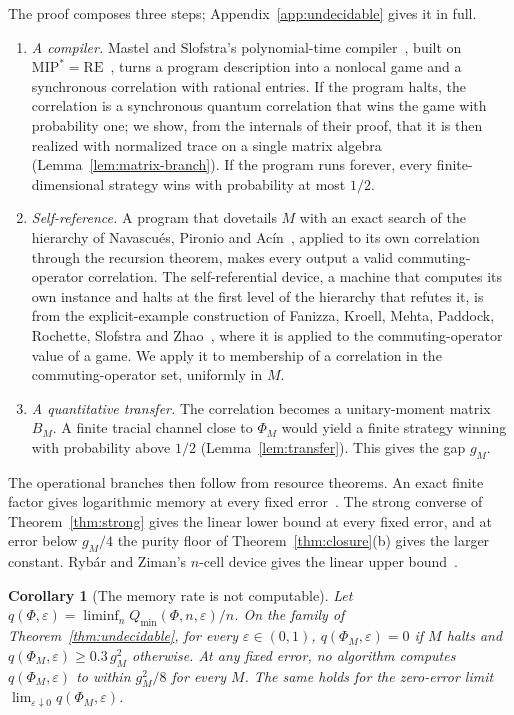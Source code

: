 \documentclass[11pt]{article}
\newtheorem{corollary}[lemma]{Corollary}
\theoremstyle{definition}
\theoremstyle{remark}
\newcommand{\eps}{\varepsilon}
\begin{document}
The proof composes three steps; Appendix~\ref{app:undecidable} gives it in full.
\begin{enumerate}[label=(\roman*),itemsep=2pt]
\item \emph{A compiler.} Mastel and Slofstra's polynomial-time compiler~\cite[Corollary~9.16]{MastelSlofstra}, built on $\mathrm{MIP}^*=\mathrm{RE}$~\cite{MIP,NatarajanZhang}, turns a program description into a nonlocal game and a synchronous correlation with rational entries. If the program halts, the correlation is a synchronous quantum correlation that wins the game with probability one; we show, from the internals of their proof, that it is then realized with normalized trace on a single matrix algebra (Lemma~\ref{lem:matrix-branch}). If the program runs forever, every finite-dimensional strategy wins with probability at most $1/2$.
\item \emph{Self-reference.} A program that dovetails $M$ with an exact search of the hierarchy of Navascu\'es, Pironio and Ac\'in~\cite{NPA}, applied to its own correlation through the recursion theorem, makes every output a valid commuting-operator correlation. The self-referential device, a machine that computes its own instance and halts at the first level of the hierarchy that refutes it, is from the explicit-example construction of Fanizza, Kroell, Mehta, Paddock, Rochette, Slofstra and Zhao~\cite[Section~4.2]{FanizzaEtAl}, where it is applied to the commuting-operator value of a game. We apply it to membership of a correlation in the commuting-operator set, uniformly in $M$.
\item \emph{A quantitative transfer.} The correlation becomes a unitary-moment matrix $B_M$. A finite tracial channel close to $\Phi_M$ would yield a finite strategy winning with probability above $1/2$ (Lemma~\ref{lem:transfer}). This gives the gap $g_M$.
\end{enumerate}
The operational branches then follow from resource theorems. An exact finite factor gives logarithmic memory at every fixed error~\cite[Theorem~6.1]{Memory}. The strong converse of Theorem~\ref{thm:strong} gives the linear lower bound at every fixed error, and at error below $g_M/4$ the purity floor of Theorem~\ref{thm:closure}(b) gives the larger constant. Ryb\'ar and Ziman's $n$-cell device gives the linear upper bound~\cite{RybarZiman}.

\begin{corollary}[The memory rate is not computable]\label{cor:rate}
Let $q(\Phi,\eps)=\liminf_n Q_{\min}(\Phi,n,\eps)/n$. On the family of Theorem~\ref{thm:undecidable}, for every $\eps\in(0,1)$, $q(\Phi_M,\eps)=0$ if $M$ halts and $q(\Phi_M,\eps)\ge0.3\,g_M^2$ otherwise. At any fixed error, no algorithm computes $q(\Phi_M,\eps)$ to within $g_M^2/8$ for every $M$. The same holds for the zero-error limit $\lim_{\eps\downarrow0}q(\Phi_M,\eps)$.
\end{corollary}
\end{document}
